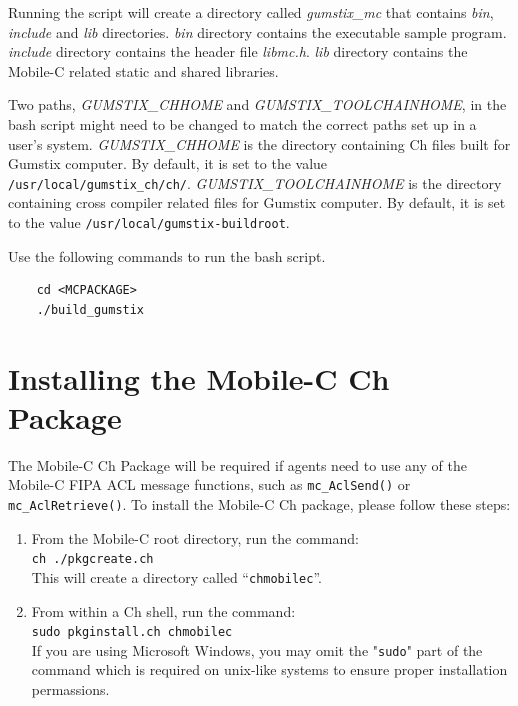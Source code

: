 \documentclass[11pt]{report}
\begin{document}
Running the script will create a directory called \textit{gumstix\_mc} that 
contains \textit{bin}, \textit{include} and \textit{lib} directories.
\textit{bin} directory contains the executable sample program.    
\textit{include} directory contains the header file \textit{libmc.h}.
\textit{lib} directory contains the Mobile-C related static and shared 
libraries.

Two paths, \textit{GUMSTIX\_CHHOME} and \textit{GUMSTIX\_TOOLCHAINHOME}, 
in the bash script might need to be changed to match the correct 
paths set up in a user's system.
\textit{GUMSTIX\_CHHOME} is the directory containing Ch files built for 
Gumstix computer. By default, it is set to the value \texttt{/usr/local/gumstix\_ch/ch/}.
\textit{GUMSTIX\_TOOLCHAINHOME} is the directory containing cross compiler 
related files for Gumstix computer. By default, it is set to the value \texttt{/usr/local/gumstix-buildroot}.

Use the following commands to run the bash script.

\begin{verbatim}
    cd <MCPACKAGE>
    ./build_gumstix
\end{verbatim}

\section{Installing the Mobile-C Ch Package}
The Mobile-C Ch Package will be required if agents need to use any of the
Mobile-C FIPA ACL message functions, such as \texttt{mc\_AclSend()} or
\texttt{mc\_AclRetrieve()}. To install the Mobile-C Ch package, please follow
these steps:
\begin{enumerate}
\item From the Mobile-C root directory, run the command: \\
\texttt{ch ./pkgcreate.ch} \\
This will create a directory called ``\texttt{chmobilec}''.
\item From within a Ch shell, run the command: \\
\texttt{sudo pkginstall.ch chmobilec} \\
If you are using Microsoft Windows, you may omit the "\texttt{sudo}" part of the
command which is required on unix-like systems to ensure proper installation
permassions.
\end{enumerate}
\end{document}
